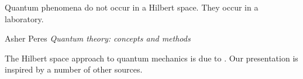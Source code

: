 

\label{chap:rules}

\begin{refsection}

\begin{quoting}
   \openquote 
   Quantum phenomena do not occur in a Hilbert space. They occur in a
   laboratory.~\closequote
   \begin{flushright}
       Asher Peres 
       \emph{Quantum theory: concepts and methods}
    \end{flushright}
\end{quoting}


  The Hilbert space approach to quantum mechanics is due to \textcite{Neumann:1955}.
  Our presentation is inspired by a number of other sources. 


\printbibliography[heading=subbibliography]
\end{refsection}

